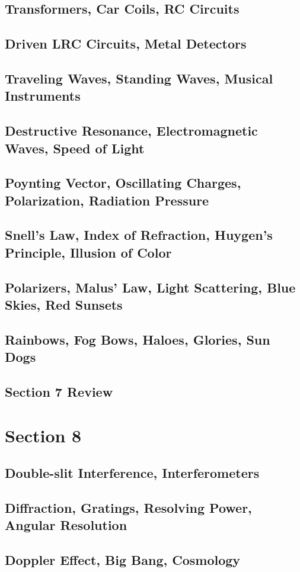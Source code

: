 \documentclass[../introphysics.tex]{subfiles}
\begin{document}
\section{Transformers, Car Coils, RC Circuits}
\section{Driven LRC Circuits, Metal Detectors}
\section{Traveling Waves, Standing Waves, Musical Instruments}
\section{Destructive Resonance, Electromagnetic Waves, Speed of Light}
\section{Poynting Vector, Oscillating Charges, Polarization, Radiation Pressure}
\section{Snell's Law, Index of Refraction, Huygen's Principle, Illusion of Color}
\section{Polarizers, Malus' Law, Light Scattering, Blue Skies, Red Sunsets}
\section{Rainbows, Fog Bows, Haloes, Glories, Sun Dogs}
\section{Section 7 Review}
\chapter{Section 8}
\section{Double-slit Interference, Interferometers}
\section{Diffraction, Gratings, Resolving Power, Angular Resolution}
\section{Doppler Effect, Big Bang, Cosmology}
\end{document}
